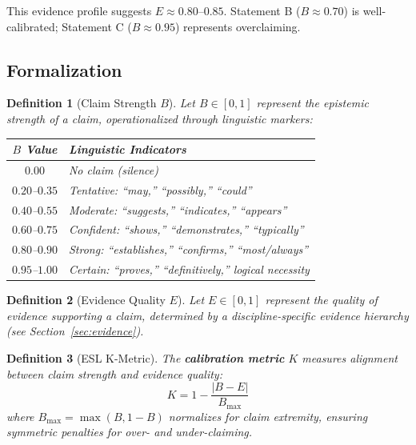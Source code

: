 \documentclass[11pt,a4paper]{article}
\newtheorem{definition}{Definition}[section]
\begin{document}
This evidence profile suggests $E \approx 0.80$--$0.85$. Statement B ($B \approx 0.70$) is well-calibrated; Statement C ($B \approx 0.95$) represents overclaiming.

\subsection{Formalization}

\begin{definition}[Claim Strength $B$]
\label{def:B}
Let $B \in [0, 1]$ represent the epistemic strength of a claim, operationalized through linguistic markers:
\begin{center}
\begin{tabular}{cl}
\toprule
\textbf{$B$ Value} & \textbf{Linguistic Indicators} \\
\midrule
$0.00$ & No claim (silence) \\
$0.20$--$0.35$ & Tentative: ``may,'' ``possibly,'' ``could'' \\
$0.40$--$0.55$ & Moderate: ``suggests,'' ``indicates,'' ``appears'' \\
$0.60$--$0.75$ & Confident: ``shows,'' ``demonstrates,'' ``typically'' \\
$0.80$--$0.90$ & Strong: ``establishes,'' ``confirms,'' ``most/always'' \\
$0.95$--$1.00$ & Certain: ``proves,'' ``definitively,'' logical necessity \\
\bottomrule
\end{tabular}
\end{center}
\end{definition}

\begin{definition}[Evidence Quality $E$]
\label{def:E}
Let $E \in [0, 1]$ represent the quality of evidence supporting a claim, determined by a discipline-specific evidence hierarchy (see Section~\ref{sec:evidence}).
\end{definition}

\begin{definition}[ESL K-Metric]
\label{def:K}
The \textbf{calibration metric} $K$ measures alignment between claim strength and evidence quality:
\begin{equation}
K = 1 - \frac{|B - E|}{B_{\max}}
\label{eq:K}
\end{equation}
where $B_{\max} = \max(B, 1-B)$ normalizes for claim extremity, ensuring symmetric penalties for over- and under-claiming.
\end{definition}
\end{document}
